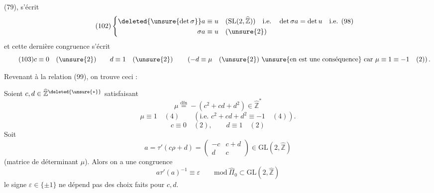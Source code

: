 
  (79),
 s'écrit
\[
\tag{102}
\left\{\begin{aligned}
\deleted{\unsure{\det\sigma}}a&\equiv u\quad
(\mathrm{SL}(2,\widehat{\mathbb Z}))\quad\text{i.e.}\quad
\det\sigma a=\det u\quad\text{i.e. (98)}\\
\sigma a&\equiv u\quad(\unsure{2})
\end{aligned}\right.
\]
 et cette dernière congruence s'écrit
\[
\tag{103}
c\equiv0\quad(\unsure{2})\qquad d\equiv1\quad(\unsure{2})
\qquad
\left(-d\equiv\mu\quad(\unsure{2})\ \text{\unsure{en est une conséquence}}
\ \text{car }\mu\equiv1\equiv-1\quad(2)\right).
\]



Revenant à la relation (99), on trouve ceci :

  Soient
$c,d\in\widehat{\mathbb Z}^{\deleted{\unsure{*}}}$ satisfaisant
\[
\tag{104}
\mu\overset{\mathrm{dfn}}{=}-(c^2+cd+d^2)\in\widehat{\mathbb Z}^{*}
\]
\[
\tag{105}
\mu\equiv1\quad(4)\qquad
(\text{i.e. }c^2+cd+d^2\equiv-1\quad(4)).
\]
\[
\tag{106}
c\equiv0\quad(2),\qquad d\equiv1\quad(2)
\]
Soit  
\[
\tag{107}
a=\tau'(c\rho+d)=
\begin{pmatrix}-c&c+d\\d&c\end{pmatrix}
\in\mathrm{GL}(2,\widehat{\mathbb Z})
\]
(matrice de déterminant $\mu$). Alors on a une congruence
\[
\tag{108}
a\tau'(a)^{-1}\equiv\varepsilon\qquad
\mathrm{mod}\ \widehat{\Pi}_0\subset\mathrm{GL}(2,\widehat{\mathbb Z})
\]
 le signe $\varepsilon\in\{\pm1\}$ ne dépend pas des
choix faits pour $c,d$.


